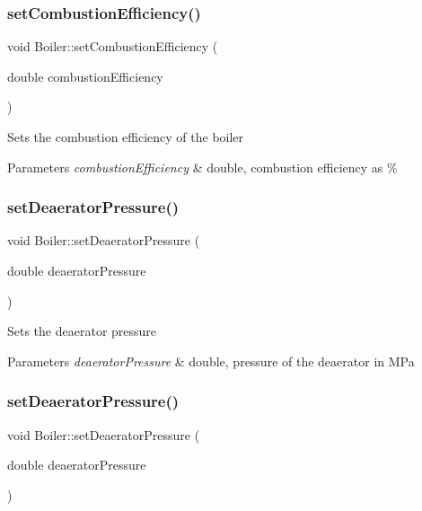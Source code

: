 \subsubsection{\texorpdfstring{set\+Combustion\+Efficiency()}{setCombustionEfficiency()}\hspace{0.1cm}{\footnotesize\ttfamily [3/3]}}
{\footnotesize\ttfamily void Boiler\+::set\+Combustion\+Efficiency (\begin{DoxyParamCaption}\item[{double}]{combustion\+Efficiency }\end{DoxyParamCaption})}

Sets the combustion efficiency of the boiler 
\begin{DoxyParams}{Parameters}
{\em combustion\+Efficiency} & double, combustion efficiency as \% \\
\hline
\end{DoxyParams}
\mbox{\label{class_boiler_a56f422254606ebba1248ae0b4f8f0215}} 
\subsubsection{\texorpdfstring{set\+Deaerator\+Pressure()}{setDeaeratorPressure()}\hspace{0.1cm}{\footnotesize\ttfamily [1/3]}}
{\footnotesize\ttfamily void Boiler\+::set\+Deaerator\+Pressure (\begin{DoxyParamCaption}\item[{double}]{deaerator\+Pressure }\end{DoxyParamCaption})}

Sets the deaerator pressure 
\begin{DoxyParams}{Parameters}
{\em deaerator\+Pressure} & double, pressure of the deaerator in M\+Pa \\
\hline
\end{DoxyParams}
\mbox{\label{class_boiler_a56f422254606ebba1248ae0b4f8f0215}} 
\subsubsection{\texorpdfstring{set\+Deaerator\+Pressure()}{setDeaeratorPressure()}\hspace{0.1cm}{\footnotesize\ttfamily [2/3]}}
{\footnotesize\ttfamily void Boiler\+::set\+Deaerator\+Pressure (\begin{DoxyParamCaption}\item[{double}]{deaerator\+Pressure }\end{DoxyParamCaption})}

